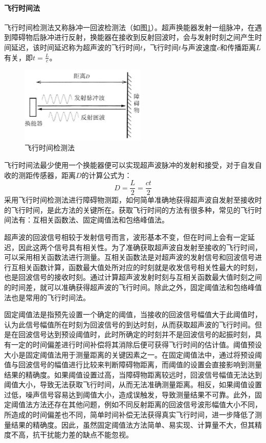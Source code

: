     
    \paragraph{飞行时间法}
    飞行时间检测法又称脉冲一回波检测法（如图\ref{飞行时间检测法}）。超声换能器发射一组脉冲，在遇到障碍物后脉冲进行反射，换能器在接收到反射回波时，会与发射时刻之间产生时间延迟，该时间延迟称为超声波的飞行时间$t$，飞行时间$t$与声波速度$c$和传播距离$L$有关，即$t=\frac{L}{c}$。\par
    \begin{figure}[!h]
    	\centering
    	\includegraphics[width=6cm]{figure/飞行时间检测法.png}
    	\caption{飞行时间检测法}
    	\label{飞行时间检测法}
    \end{figure}\par
    飞行时间法最少使用一个换能器便可以实现超声波脉冲的发射和接受，对于自发自收的测距传感器，距离$D$的计算公式为：
    \begin{equation}
    	D=\frac{L}{2}=\frac{ct}{2}
    \end{equation}
	采用飞行时间检测法进行障碍物测距，如何简单准确地获得超声波自发射至接收时的飞行时间，是此方法的关键所在。获取飞行时间的方法有很多种，常见的飞行时间法有：互相关函数法、固定阈值法和包络峰值法。\par
	超声波的回波信号相较于发射信号而言，波形基本不变，但在时间上会有一定延迟，因此这两个信号具有相关性。为了准确获取超声波自发射至接收的飞行时间，可以采用相关函数法进行测量。互相关函数法是对超声波的发射信号和回波信号进行互相关函数计算，函数最大值处所对应的时刻就是收发信号相关性最大的时刻，也是回波信号的接收时刻。通过计算超声波发射时刻与互相关函数最大值时刻之间的时间差，就可以准确获得超声波的飞行时间。除此之外，固定阈值法和包络峰值法也是常用的飞行时间法。\par
	固定阈值法是指预先设置一个确定的阈值，当接收的回波信号幅值大于此阈值时，认为此信号幅值所在时刻为回波信号的到达时刻，从而获取超声波的飞行时间。但是在回波信号达到预设阈值时，此时所确定的时刻并不是回波信号的起振时刻，具有一定的时间偏差进行时间补偿将其消除后便可获得飞行时间的估计值。阈值预设大小是固定阈值法用于测量距离的关键因素之一。在固定阈值法中，通过将预设阈值与回波信号的幅值进行比较来判断障碍物距离，而阈值的设置会直接影响到测量结果的精确度。如果阈值设置过高，当障碍物距离较远时，回波信号幅值无法达到阈值大小，导致无法获取飞行时间，从而无法准确测量距离。相反，如果阈值设置过低，噪声信号容易达到阈值大小，造成误触发，导致测量结果不可靠。此外，固定阈值法方法还存在其他问题，例如不同反射距离的回波信号波形幅值大小不同，所造成的时间偏差也不同，简单时间补偿无法获得真实飞行时间，进一步降低了测量结果的精确度。因此，虽然固定阈值法方法简单、易实现、计算量不大，但其精度不高，抗干扰能力差的缺点不能忽视。\par
